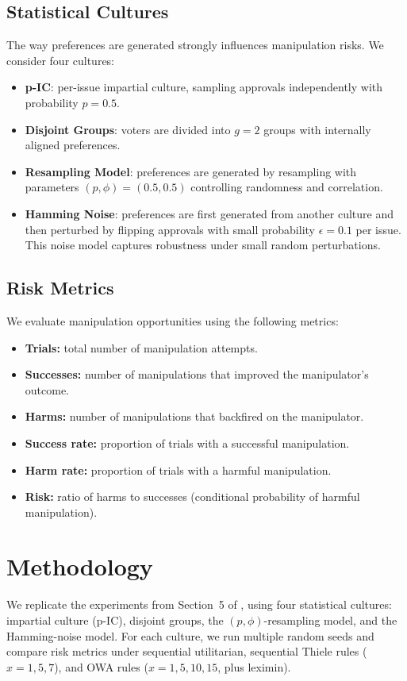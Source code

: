 \documentclass[11pt]{article}
\begin{document}
\subsection{Statistical Cultures}
The way preferences are generated strongly influences manipulation risks.
We consider four cultures:
\begin{itemize}
    \item \textbf{p-IC}: per-issue impartial culture, sampling approvals
    independently with probability $p=0.5$.
    \item \textbf{Disjoint Groups}: voters are divided into $g=2$ groups with
    internally aligned preferences.
    \item \textbf{Resampling Model}: preferences are generated by resampling
    with parameters $(p, \phi) = (0.5, 0.5)$ controlling randomness and correlation.
    \item \textbf{Hamming Noise}: preferences are first generated from another
    culture and then perturbed by flipping approvals with small probability
    $\epsilon=0.1$ per issue. This noise model captures robustness under
    small random perturbations.
\end{itemize}

\subsection{Risk Metrics}
We evaluate manipulation opportunities using the following metrics:
\begin{itemize}
    \item \textbf{Trials:} total number of manipulation attempts.
    \item \textbf{Successes:} number of manipulations that improved the manipulator’s outcome.
    \item \textbf{Harms:} number of manipulations that backfired on the manipulator.
    \item \textbf{Success rate:} proportion of trials with a successful manipulation.
    \item \textbf{Harm rate:} proportion of trials with a harmful manipulation.
    \item \textbf{Risk:} ratio of harms to successes (conditional probability of harmful manipulation).
\end{itemize}

\section{Methodology}
We replicate the experiments from Section~5 of \cite{lackner2023freeriding},
using four statistical cultures: impartial culture (p-IC), disjoint groups,
the $(p, \phi)$-resampling model, and the Hamming-noise model. For each culture,
we run multiple random seeds and compare risk metrics under sequential
utilitarian, sequential Thiele rules ($x=1,5,7$), and OWA rules ($x=1,5,10,15$, plus leximin).
\end{document}
